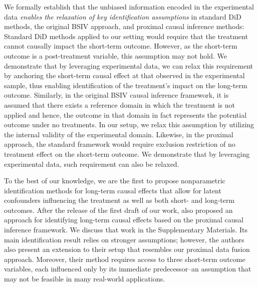 \documentclass[10pt]{article}
\begin{document}
We formally establish that the unbiased information encoded in the experimental data \emph{enables the relaxation of key identification assumptions} in standard DiD methods, the original BSIV approach, and proximal causal inference methods:
Standard DiD methods applied to our setting would require that the treatment cannot causally impact the short-term outcome. However, as the short-term outcome is a post-treatment variable, this assumption may not hold. We demonstrate that by leveraging experimental data, we can relax this requirement by anchoring the short-term causal effect at that observed in the experimental sample, thus enabling identification of the treatment’s impact on the long-term outcome.
Similarly, in the original BSIV causal inference framework, it is assumed that there exists a reference domain in which the treatment is not applied and hence, the outcome in that domain in fact represents the potential outcome under no treatments. In our setup, we relax this assumption by utilizing the internal validity of the experimental domain.
Likewise, in the proximal approach, the standard framework would require exclusion restriction of no treatment effect on the short-term outcome. We demonstrate that by leveraging experimental data, such requirement can also be relaxed.

To the best of our knowledge, we are the first to propose nonparametric identification methods for long-term causal effects that allow for latent confounders influencing the treatment as well as both short- and long-term outcomes. After the release of the first draft of our work, \cite{imbens2022long} also proposed an approach for identifying long-term causal effects based on the proximal causal inference framework. We discuss that work in the Supplementary Materials. Its main identification result relies on stronger assumptions; however, the authors also present an extension to their setup that resembles our proximal data fusion approach.  Moreover, their method requires access to three short-term outcome variables, each influenced only by its immediate predecessor--an assumption that may not be feasible in many real-world applications.
\end{document}
